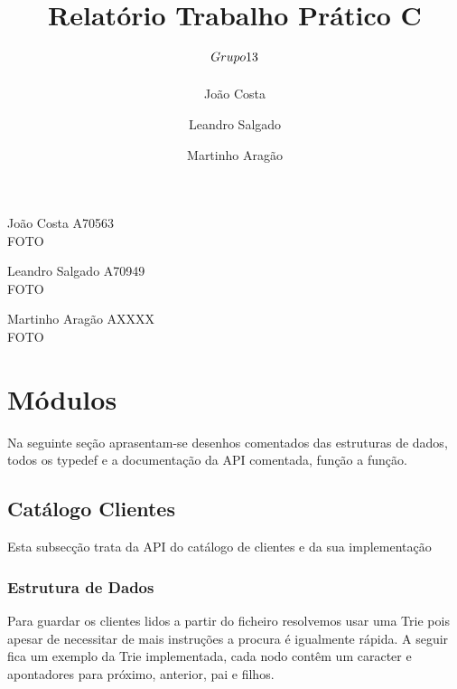 \documentclass[10pt] {article}
\begin{document}
\title{Relatório Trabalho Prático C \\ $\small{Grupo 13}$}
\author{João Costa \and Leandro Salgado \and Martinho Aragão}

\maketitle


\begin{flushleft}
João Costa A70563 \\
FOTO
\end{flushleft}

\begin{flushleft}
Leandro Salgado A70949 \\
FOTO
\end{flushleft}

\begin{flushleft}
Martinho Aragão AXXXX \\
FOTO
\end{flushleft}

\newpage

\tableofcontents

\newpage

\section{Módulos}
Na seguinte seção aprasentam-se desenhos comentados das estruturas de dados,
todos os typedef e a documentação da API comentada, função a função.


\subsection{Catálogo Clientes}
\par Esta subsecção trata da API do catálogo de clientes e da sua implementação

\subsubsection{Estrutura de Dados}
\par
Para guardar os clientes lidos a partir do ficheiro resolvemos usar uma Trie pois apesar de
necessitar de mais instruções a procura é igualmente rápida. A seguir fica um exemplo da Trie implementada, 
cada nodo contêm um caracter e apontadores para próximo, anterior, pai e filhos.
\end{document}
